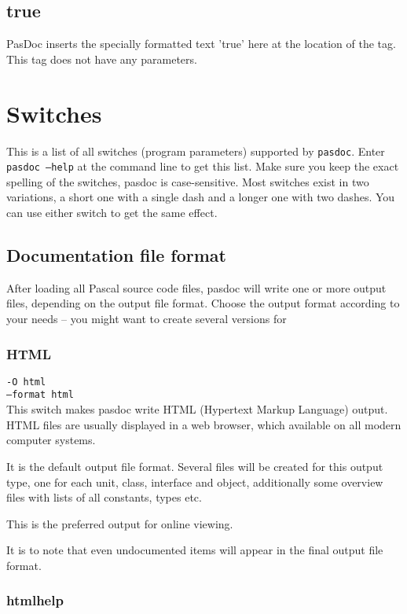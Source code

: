 \documentclass[11pt]{article}
\begin{document}
\subsection{true}

PasDoc inserts the specially formatted text 'true' here
at the location of the tag. This tag does not have any
parameters.

\section{Switches}

This is a list of all switches (program parameters) supported by {\tt pasdoc}.
Enter {\tt pasdoc --help} at the command line to get this list.
Make sure you keep the exact spelling of the switches, pasdoc is case-sensitive.
Most switches exist in two variations, a short one with a single dash and
a longer one with two dashes.
You can use either switch to get the same effect.

\subsection{Documentation file format}

After loading all Pascal source code files, pasdoc will write one or more
output files, depending on the output file format.
Choose the output format according to your needs -- you might want to create
several versions for 

\subsubsection{HTML}

{\tt -O html}\\
{\tt --format html}\\

This switch makes pasdoc write HTML (Hypertext Markup Language) output.
HTML files are usually displayed in a web browser, which available on
all modern computer systems. 

It is the default output file format. Several files will be created for 
this output type, one for each unit, class, interface and object, 
additionally some overview files with lists of all constants, types etc.

This is the preferred output for online viewing.

It is to note that even undocumented items will appear in the final
output file format.

\subsubsection{htmlhelp}
\end{document}
